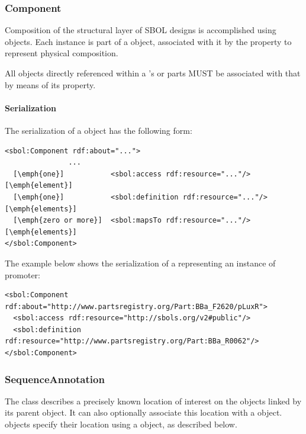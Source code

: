 \subsubsection{Component}
\label{sec:Component}
Composition of the structural layer of SBOL designs is accomplished using  objects. Each  instance is part of a  object, associated with it by the  property to represent  physical composition.  

All  objects directly referenced within a 's  or  parts MUST be associated with that  by means of its  property.

\paragraph{Serialization}

The serialization of a  object has the following form:

\begin{lstlisting}
<sbol:Component rdf:about="...">
               ...
  [\emph{one}]           <sbol:access rdf:resource="..."/> [\emph{element}]
  [\emph{one}]           <sbol:definition rdf:resource="..."/> [\emph{elements}]    
  [\emph{zero or more}]  <sbol:mapsTo rdf:resource="..."/> [\emph{elements}]
</sbol:Component>
\end{lstlisting}

The example below shows the serialization of a 
representing an instance of promoter:

\begin{lstlisting}
<sbol:Component rdf:about="http://www.partsregistry.org/Part:BBa_F2620/pLuxR">
  <sbol:access rdf:resource="http://sbols.org/v2#public"/>
  <sbol:definition rdf:resource="http://www.partsregistry.org/Part:BBa_R0062"/>
</sbol:Component>
\end{lstlisting}


\subsubsection{SequenceAnnotation}
\label{sec:SequenceAnnotation}
The  class describes a precisely known location of interest on the  objects linked by its parent  object.  It can also optionally associate this location with a  object.  objects specify their location using a  object, as described below.

